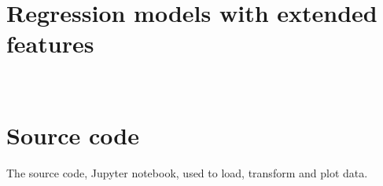 \documentclass[%
oneside,    %
project,    %
nosummary   %
]{USN-MSc}
\begin{document}
\chapter{Regression models with extended features}
\label{ch:regressionExtended}
\lipsum[1]


~\nocite{*}

\cleardoublepage

\printbibliography[heading=bibintoc, title={References}]


\appendix
%
%
%
%
%
%
%
%
%
%
%
%
%
\chapter[Source code]{Source code}
\label{paper-a}
The source code, Jupyter notebook, used to load, transform and plot data.
%
\end{document}
